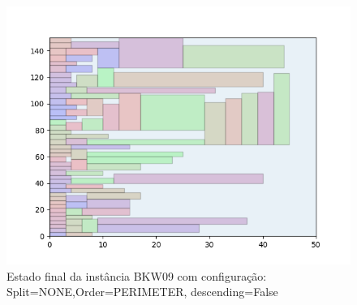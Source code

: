 \begin{figure}[H]
    \centering
    \caption[]{Estado final da instância BKW09 com configuração: Split=NONE,Order=PERIMETER, descending=False}
    \label{fig:bkw09-none-perimeter-false}
    \includegraphics[scale=0.5]{output/figures/bkw/bkw09/none/perimeter/false/000}
\end{figure}
